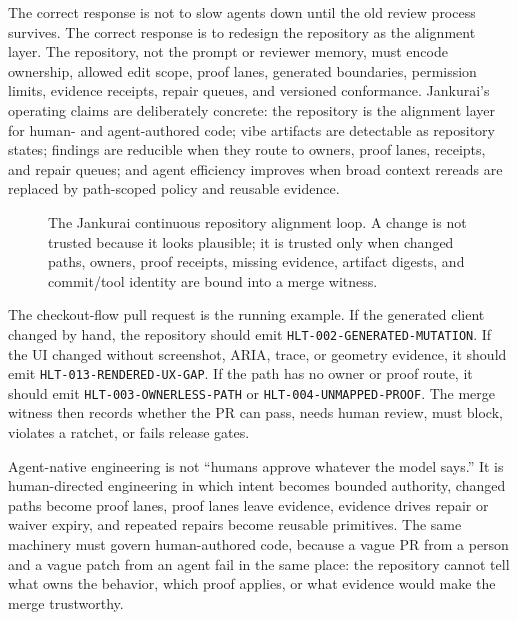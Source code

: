 The correct response is not to slow agents down until the old review process survives. The correct response is to redesign the repository as the alignment layer. The repository, not the prompt or reviewer memory, must encode ownership, allowed edit scope, proof lanes, generated boundaries, permission limits, evidence receipts, repair queues, and versioned conformance. Jankurai's operating claims are deliberately concrete: the repository is the alignment layer for human- and agent-authored code; vibe artifacts are detectable as repository states; findings are reducible when they route to owners, proof lanes, receipts, and repair queues; and agent efficiency improves when broad context rereads are replaced by path-scoped policy and reusable evidence.

\begin{figure}[t]
\centering
{}
\caption{The Jankurai continuous repository alignment loop. A change is not trusted because it looks plausible; it is trusted only when changed paths, owners, proof receipts, missing evidence, artifact digests, and commit/tool identity are bound into a merge witness.}
\label{fig:alignment-loop}
\end{figure}

The checkout-flow pull request is the running example. If the generated client changed by hand, the repository should emit \texttt{HLT-002-GENERATED-MUTATION}. If the UI changed without screenshot, ARIA, trace, or geometry evidence, it should emit \texttt{HLT-013-RENDERED-UX-GAP}. If the path has no owner or proof route, it should emit \texttt{HLT-003-OWNERLESS-PATH} or \texttt{HLT-004-UNMAPPED-PROOF}. The merge witness then records whether the PR can pass, needs human review, must block, violates a ratchet, or fails release gates.

Agent-native engineering is not ``humans approve whatever the model says.'' It is human-directed engineering in which intent becomes bounded authority, changed paths become proof lanes, proof lanes leave evidence, evidence drives repair or waiver expiry, and repeated repairs become reusable primitives. The same machinery must govern human-authored code, because a vague PR from a person and a vague patch from an agent fail in the same place: the repository cannot tell what owns the behavior, which proof applies, or what evidence would make the merge trustworthy.

